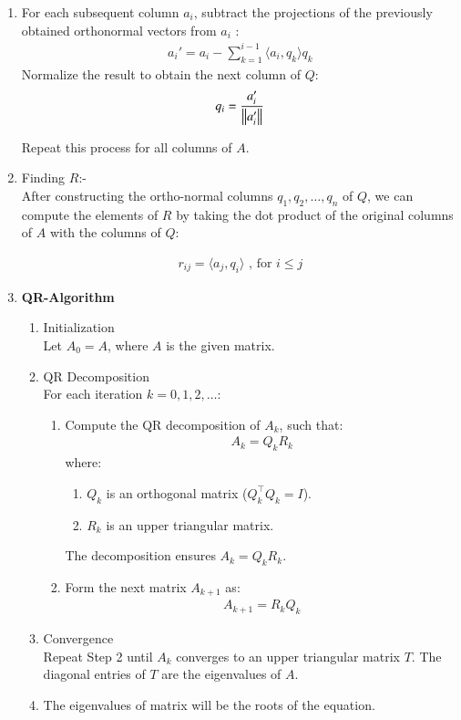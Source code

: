 \documentclass[journal]{IEEEtran}
\begin{document}
\begin{enumerate}
\item  For each subsequent column $ a_i $, subtract the projections of the previously obtained orthonormal vectors from $ a_i $ :
\begin{align}
a_i' = a_i - \sum_{k=1}^{i-1} \langle a_i, q_k \rangle q_k
\end{align}
Normalize the result to obtain the next column of \( Q \):
\begin{align}
q_i = \frac{a_i'}{\left\lVert a_i'\right\rVert}
\end{align}

Repeat this process for all columns of \( A \).
\item Finding $R$:- \\
After constructing the ortho-normal columns $ q_1, q_2, \dots, q_n $ of $Q$, we can compute the elements of $R$ by taking the dot product of the original columns of $A$ with the columns of $Q$:

\begin{align}
    r_{ij} = \langle a_j, q_i \rangle \text{ , for  }  i \leq j 
\end{align}
\item \textbf{QR-Algorithm}\\
\begin{enumerate}
\item Initialization \\
Let $A_0 = A $, where $A$ is the given matrix.

\item QR Decomposition \\
For each iteration $ k = 0, 1, 2, \dots $:
\begin{enumerate}
    \item Compute the QR decomposition of \( A_k \), such that:
    \begin{align}
    A_k = Q_k R_k
    \end{align}
    where:
    \begin{enumerate}
        \item $Q_k $ is an orthogonal matrix ($ Q_k^\top Q_k = I $).
        \item $ R_k $ is an upper triangular matrix.
    \end{enumerate}
    The decomposition ensures $ A_k = Q_k R_k $.

    \item Form the next matrix \( A_{k+1} \) as:
    \begin{align}
    A_{k+1} = R_k Q_k
    \end{align}
\end{enumerate}
\item Convergence\\
Repeat Step 2 until $ A_k $ converges to an upper triangular matrix $ T $. The diagonal entries of $T$ are the eigenvalues of $A$.\\
\item The eigenvalues of matrix will be the roots of the equation.

\end{enumerate}



\end{enumerate}
\end{document}
